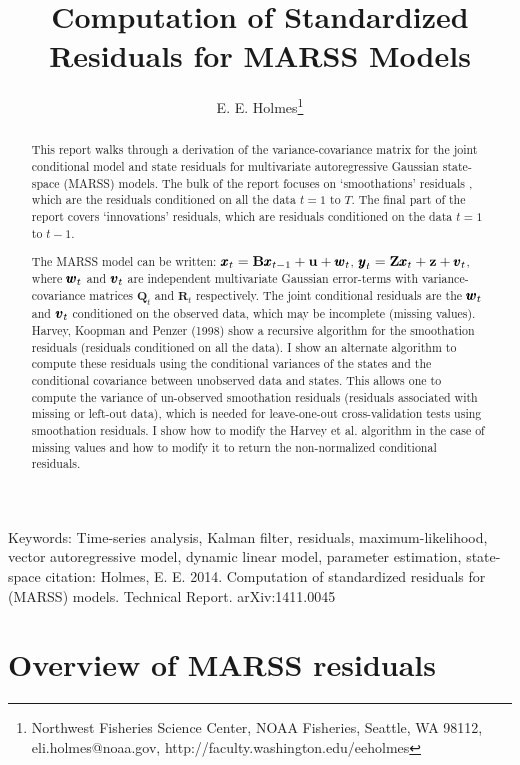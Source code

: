 \documentclass[]{article}
\def\UPS{\mbox{\boldmath $\Upsilon$}}
\def\XI{\mbox{\boldmath $\Xi$}}
\def\BB{\mbox{$\mathbf B$}}	\def\bb{\mbox{$\mathbf b$}} \def\Bb{\mbox{$\mathbf J$}} \def\Ba{\mbox{$\mathbf L$}} \def\Bm{\UPS}
\def\QQ{\mbox{$\mathbf Q$}}	 \def\qq{\mbox{$\mathbf q$}} \def\Qb{\mbox{$\mathbf G$}}  \def\Qm{\mathbb{Q}}
\def\RR{\mbox{$\mathbf R$}}	 \def\rr{\mbox{$\mathbf r$}} \def\Rb{\mbox{$\mathbf H$}}	\def\Rm{\mathbb{R}}
\def\ZZ{\mbox{$\mathbf Z$}}	\def\zz{\mbox{$\mathbf z$}}	\def\Zb{\mbox{$\mathbf M$}} \def\Za{\mbox{$\mathbf N$}} \def\Zm{\XI}
\begin{document}

\author{E. E. Holmes\footnote{Northwest Fisheries Science Center, NOAA Fisheries, Seattle, WA 98112, 
       eli.holmes@noaa.gov, http://faculty.washington.edu/eeholmes}}
\title{Computation of Standardized Residuals for MARSS Models}
\maketitle
\begin{abstract}
This report walks through a derivation of the variance-covariance matrix for the joint conditional model and state residuals for multivariate autoregressive Gaussian state-space (MARSS) models. The bulk of the report focuses on `smoothations' residuals \citep{Harveyetal1998}, which are the residuals conditioned on all the data $t=1$ to $T$. The final part of the report covers `innovations' residuals, which are residuals conditioned on the data $t=1$ to $t-1$. 

The MARSS model can be written: $\xx_t=\BB\xx_{t-1}+\uu+\ww_t$, $\yy_t=\ZZ\xx_t+\zz+\vv_t$, where $\mbox{$\pmb{w}$}_t$ and $\mbox{$\pmb{v}$}_t$ are independent multivariate Gaussian error-terms with variance-covariance matrices $\QQ_t$ and $\RR_t$ respectively. The joint conditional residuals are the $\mbox{$\pmb{w}$}_t$ and $\mbox{$\pmb{v}$}_t$ conditioned on the observed data, which may be incomplete (missing values). Harvey, Koopman and Penzer (1998) show a recursive algorithm for the smoothation residuals (residuals conditioned on all the data). I show an alternate algorithm to compute these residuals using the conditional variances of the states and the conditional covariance between unobserved data and states. This allows one to compute the variance of un-observed smoothation residuals (residuals associated with missing or left-out data), which is needed for leave-one-out cross-validation tests using smoothation residuals. I show how to modify the Harvey et al. algorithm in the case of missing values and how to modify it to return the non-normalized conditional residuals.
\end{abstract}
Keywords: Time-series analysis, Kalman filter, residuals, maximum-likelihood, vector autoregressive model, dynamic linear model, parameter estimation, state-space
\vfill
{\noindent \small citation: Holmes, E. E. 2014. Computation of standardized residuals for (MARSS) models. Technical Report. arXiv:1411.0045 }
 \newpage
 
\section{Overview of MARSS residuals}
\end{document}
